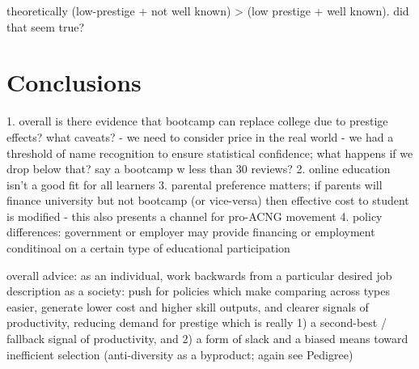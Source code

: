 \documentclass[review]{elsarticle}
\begin{document}
theoretically (low-prestige + not well known) > (low prestige + well known). did that seem true?

\section{Conclusions}

1. overall is there evidence that bootcamp can replace college due to prestige effects? what caveats?
- we need to consider price in the real world
- we had a threshold of name recognition to ensure statistical confidence; what happens if we drop below that? say a bootcamp w less than 30 reviews?
2. online education isn't a good fit for all learners
3. parental preference matters; if parents will finance university but not bootcamp (or vice-versa) then effective cost to student is modified
- this also presents a channel for pro-ACNG movement
4. policy differences: government or employer may provide financing or employment conditinoal on a certain type of educational participation

overall advice: as an individual, work backwards from a particular desired job description
as a society: push for policies which make comparing across types easier, generate lower cost and higher skill outputs,
and clearer signals of productivity, reducing demand for prestige which is really 1) a second-best / fallback signal of productivity,
and 2) a form of slack and a biased means toward inefficient selection (anti-diversity as a byproduct; again see Pedigree)


\end{document}
